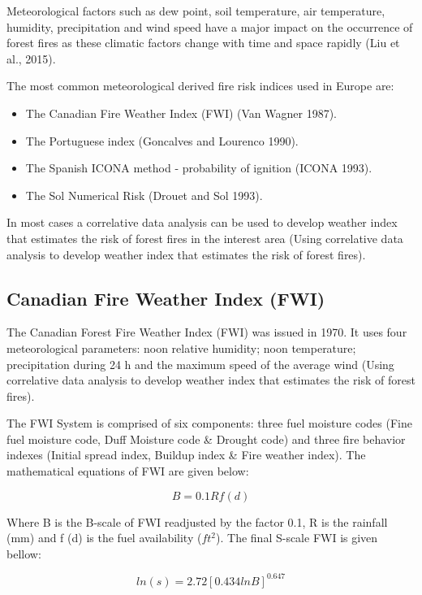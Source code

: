 {{	Meteorological factors such as dew point, soil temperature, air temperature, humidity, precipitation and wind speed have
	a major impact on the occurrence of forest fires as these climatic factors change with time and space rapidly (Liu et al., 2015).
	
	The most common meteorological derived fire risk indices used in Europe are:
	
	\begin{itemize}
		\item The Canadian Fire Weather Index (FWI) (Van Wagner 1987).
		\item The Portuguese index (Goncalves and Lourenco 1990).
		\item The Spanish ICONA method - probability of ignition (ICONA 1993).
		\item The Sol Numerical Risk (Drouet and Sol 1993).
	\end{itemize}

	In most cases a correlative data analysis can be used to develop weather index that estimates the risk of forest fires in the interest area (Using correlative data analysis to develop weather index that estimates the risk of forest fires).

\subsection{Canadian Fire Weather Index (FWI)}
	The Canadian Forest Fire Weather Index (FWI) was issued in 1970. It uses four meteorological parameters: noon relative humidity; noon temperature; precipitation during 24 h and the maximum speed of the average wind (Using correlative data analysis to develop weather index that estimates the risk of forest fires).
	
	The FWI System is comprised of six components: three fuel moisture codes (Fine fuel moisture code, Duff Moisture code \& Drought code) and three fire behavior indexes (Initial spread index, Buildup index \& Fire weather index). The mathematical equations of FWI are given below:
	
	\begin{equation}
	B=0.1Rf(d)
	\end{equation}
	
	Where B is the B-scale of FWI readjusted by the factor 0.1, R is the rainfall (mm) and f (d) is the fuel availability ($ft^2$). The final
	S-scale FWI is given bellow:

	\begin{equation}
	ln(s)=2.72[0.434lnB]^{0.647}
	\end{equation}
	
}}
